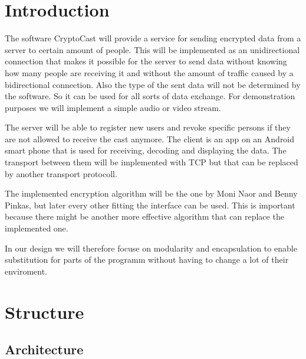\documentclass[a4paper,10pt]{scrartcl}
\title{\doctitle}
\author{\authorName}
\date{\today}
\begin{document}

\tableofcontents
\clearpage

\section{Introduction}


The software CryptoCast will provide a service for sending encrypted data from a server to certain
amount of people.  This will be implemented as an unidirectional connection that makes it possible for the server
to send data without knowing how many people are receiving it and without the amount of traffic caused
by a bidirectional connection.  Also the type of the sent data will not be determined by the software. So it can be
used for all sorts of data exchange. For demonstration purposes we will implement a simple audio or video stream.

The server will be able to register new users and revoke specific persons if they are not allowed to receive the cast anymore. 
The client is an app on an Android smart phone that is used for receiving, decoding and displaying the data. 
The transport between them will be implemented with TCP but that can be replaced by another transport protocoll.

The implemented encryption algorithm will be the one by Moni Naor and Benny Pinkas, but later every other fitting the
interface can be used. This is important because there might be another more effective algorithm that can replace the implemented one.

In our design we will therefore focuse on modularity and encapsulation to enable substitution for parts of the programm without having to 
change a lot of their enviroment.

\section{Structure}
\subsection{Architecture}
\end{document}
